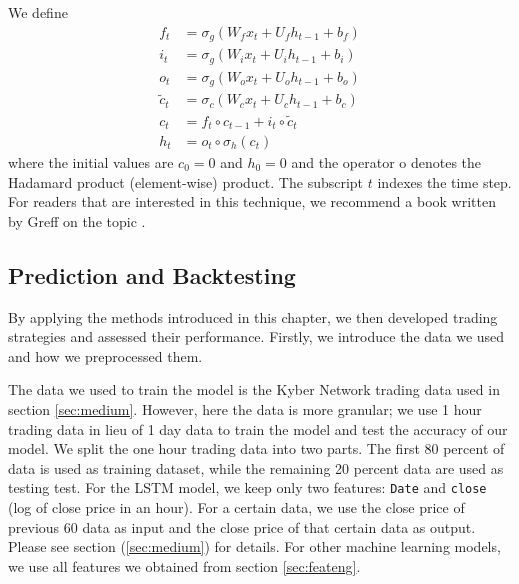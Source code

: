 \documentclass[twoside]{report}
\newcommand{\code}{\texttt}
\begin{document}
\begin{spacing}{1}
We define 
\[
\begin{aligned}
f_{t} &=\sigma_{g}\left(W_{f} x_{t}+U_{f} h_{t-1}+b_{f}\right) \\
i_{t} &=\sigma_{g}\left(W_{i} x_{t}+U_{i} h_{t-1}+b_{i}\right) \\
o_{t} &=\sigma_{g}\left(W_{o} x_{t}+U_{o} h_{t-1}+b_{o}\right) \\
\tilde{c}_{t} &=\sigma_{c}\left(W_{c} x_{t}+U_{c} h_{t-1}+b_{c}\right) \\
c_{t} &=f_{t} \circ c_{t-1}+i_{t} \circ \tilde{c}_{t} \\
h_{t} &=o_{t} \circ \sigma_{h}\left(c_{t}\right)
\end{aligned}
\]
where the initial values are $c_{0}=0$ and $h_{0}=0$ and the operator o denotes the Hadamard product (element-wise) product. The subscript $t$ indexes the time step. For readers that are interested in this technique, we recommend a book written by Greff on the topic \cite{greff2016lstm}.




\subsection{Prediction and Backtesting}
By applying the methods introduced in this chapter, we then developed trading strategies and assessed their performance. Firstly, we introduce the data we used and how we preprocessed them. 

The data we used to train the model is the Kyber Network trading data used in section \ref{sec:medium}. However, here the data is more granular; we use 1 hour trading data in lieu of 1 day data to train the model and test the accuracy of our model.  We split the one hour trading data into two parts. The first 80 percent of data is used as training dataset, while the remaining 20 percent data are used as testing test. For the LSTM model, we keep only two features: \code{Date} and \code{close} (log of close price in an hour). For a certain data, we use the close price of previous 60 data as input and the close price of that certain data as output. Please see section (\ref{sec:medium}) for details. For other machine learning models, we use all features we obtained from section \ref{sec:feateng}. 




\end{spacing}
\end{document}
